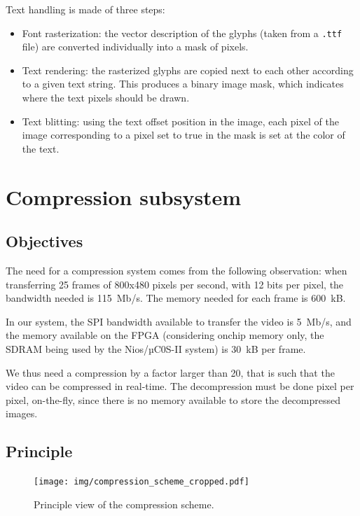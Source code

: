 \documentclass[english, DIV=13]{scrreprt}
\begin{document}
Text handling is made of three steps:
\begin{itemize}
    \item Font rasterization: the vector description of the glyphs (taken from a 
    \texttt{.ttf} file) are converted individually into a mask of pixels.
    \item Text rendering: the rasterized glyphs are copied next to each other according
    to a given text string. This produces a binary image mask, which indicates where
    the text pixels should be drawn.
    \item Text blitting: using the text offset position in the image, each pixel of the
    image corresponding to a pixel set to true in the mask is set at the color of the text.
\end{itemize}

\section{Compression subsystem}
\label{sec:compression}

\subsection{Objectives}

The need for a compression system comes from the following observation:
when transferring 25 frames of 800x480 pixels per second, with 12 bits per pixel,
the bandwidth needed is \SI{115}{Mb/s}. The memory needed for each frame
is \SI{600}{kB}.

In our system, the SPI bandwidth available to transfer the video is \SI{5}{Mb/s},
and the memory available on the FPGA (considering onchip memory only, the SDRAM
being used by the Nios/µC0S-II system) is \SI{30}{kB} per frame.

We thus need a compression by a factor larger than 20, that is such that
the video can be compressed in real-time. The decompression must be done
pixel per pixel, on-the-fly, since there is no memory available to store the
decompressed images.

\subsection{Principle}

\begin{figure}[bth]
    \centering
    \texttt{[image: img/compression\_scheme\_cropped.pdf]}
    \caption{Principle view of the compression scheme.}
    \label{fig:compression}
\end{figure}
\end{document}
